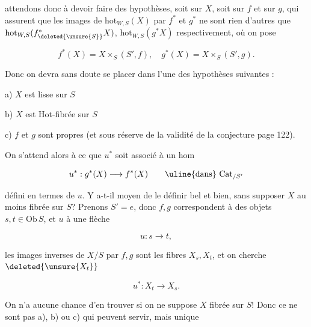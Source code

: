 
attendons donc à devoir faire des hypothèses, soit sur $X$, soit sur $f$ et sur $g$, qui assurent que les images de $\mathrm{hot}_{W,S}(X)$ par $f^*$ et $g^*$ ne sont rien d'autres que $\mathrm{hot}_{W,S}(f^*_{\deleted{\unsure{S}}}X)$, $\mathrm{hot}_{W,S}(g^*X)$ respectivement, où on pose

\[
f^*(X)=X\times_S(S',f),\quad g^*(X)=X\times_S(S',g).
\]

Donc on  devra sans doute se placer dans l'une des hypothèses suivantes :

a) $X$ est lisse sur $S$

b) $X$ est Hot-fibrée sur $S$

c) $f$ et $g$ sont propres (et sous réserve de la validité de la conjecture page 122).

On s'attend alors à ce que $u^*$ soit associé à un hom

\[
u^*:g^*(X)\longrightarrow f^*(X)\qquad\text{\uline{dans}}\ \mathrm{Cat}_{/S'}
\]

défini en termes de $u$. Y  a-t-il moyen de le définir bel et bien, sans supposer $X$  au moins fibrée sur $S$? Prenons $S'=e$, donc $f,g$ correspondent à des objets $s,t\in\mathrm{Ob}\,S$, et $u$ à une flèche

\[
u:s\longrightarrow t,
\]

les images inverses de $X/S$ par $f,g$ sont les fibres $X_s,X_t$, et on cherche $\deleted{\unsure{X_t}}$

\[
u^*:X_t\longrightarrow X_s.
\]

On n'a aucune chance d'en trouver  si on ne suppose $X$ fibrée sur $S$! Donc ce ne sont pas a), b) ou c) qui peuvent  servir, mais unique
